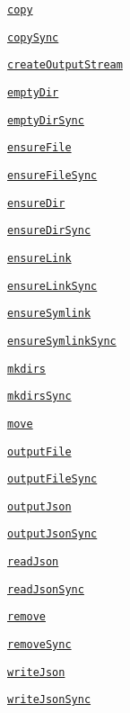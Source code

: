 \begin{DoxyItemize}
\item \href{#copy}{\tt copy}
\item \href{#copy}{\tt copy\+Sync}
\item \href{#createoutputstreamfile-options}{\tt create\+Output\+Stream}
\item \href{#emptydirdir-callback}{\tt empty\+Dir}
\item \href{#emptydirdir-callback}{\tt empty\+Dir\+Sync}
\item \href{#ensurefilefile-callback}{\tt ensure\+File}
\item \href{#ensurefilefile-callback}{\tt ensure\+File\+Sync}
\item \href{#ensuredirdir-callback}{\tt ensure\+Dir}
\item \href{#ensuredirdir-callback}{\tt ensure\+Dir\+Sync}
\item \href{#ensurelinksrcpath-dstpath-callback}{\tt ensure\+Link}
\item \href{#ensurelinksrcpath-dstpath-callback}{\tt ensure\+Link\+Sync}
\item \href{#ensuresymlinksrcpath-dstpath-type-callback}{\tt ensure\+Symlink}
\item \href{#ensuresymlinksrcpath-dstpath-type-callback}{\tt ensure\+Symlink\+Sync}
\item \href{#mkdirsdir-callback}{\tt mkdirs}
\item \href{#mkdirsdir-callback}{\tt mkdirs\+Sync}
\item \href{#movesrc-dest-options-callback}{\tt move}
\item \href{#outputfilefile-data-callback}{\tt output\+File}
\item \href{#outputfilefile-data-callback}{\tt output\+File\+Sync}
\item \href{#outputjsonfile-data-callback}{\tt output\+Json}
\item \href{#outputjsonfile-data-callback}{\tt output\+Json\+Sync}
\item \href{#readjsonfile-options-callback}{\tt read\+Json}
\item \href{#readjsonfile-options-callback}{\tt read\+Json\+Sync}
\item \href{#removedir-callback}{\tt remove}
\item \href{#removedir-callback}{\tt remove\+Sync}
\item \href{#writejsonfile-object-options-callback}{\tt write\+Json}
\item \href{#writejsonfile-object-options-callback}{\tt write\+Json\+Sync}
\end{DoxyItemize}

